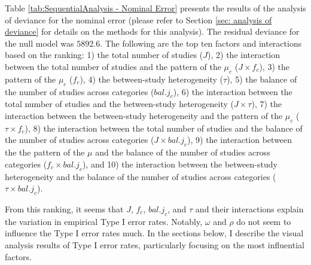 Table \ref{tab:SequentialAnalysis - Nominal Error} presents the results of the analysis of deviance for the nominal error (please refer to Section \ref{sec: analysis of deviance} for details on the methods for this analysis). The residual deviance for the null model was $5892.6$. The following are the top ten factors and interactions based on the ranking: 1) the total number of studies ($J$), 2) the interaction between the total number of studies and the pattern of the $\mu_c$ ($J \times f_c$), 3) the pattern of the $\mu_c$ ($f_c$), 4) the between-study heterogeneity ($\tau$), 5) the balance of the number of studies across categories ($bal. j_c$),
6) the interaction between the total number of studies and the between-study heterogeneity ($J \times \tau$), 7) the interaction between the between-study heterogeneity and the pattern of the $\mu_c$ ($\tau \times f_c$), 8) the interaction between the total number of studies and the balance of the number of studies across categories ($J \times bal. j_c$), 9) the interaction between the the pattern of the $\mu$ and the balance of the number of studies across categories ($f_c \times bal. j_c$), and 10) the interaction between the between-study heterogeneity and the balance of the number of studies across categories ($\tau \times bal. j_c$). 

From this ranking, it seems that $J$, $f_c$, $bal. j_c$, and $\tau$ and their interactions explain the variation in empirical Type I error rates. Notably, $\omega$ and $\rho$ do not seem to influence the Type I error rates much. In the sections below, I describe the visual analysis results of Type I error rates, particularly focusing on the most influential factors.

